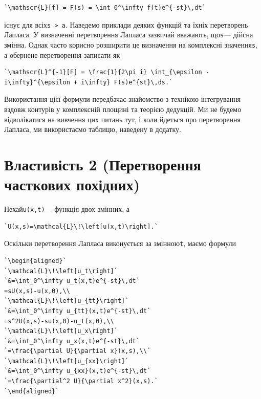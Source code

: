 \documentclass[
  ukrainian,
]{article}
\begin{document}
\begin{verbatim}
`\mathscr{L}[f] = F(s) = \int_0^\infty f(t)e^{-st}\,dt`
\end{verbatim}

існує для всіх\texttt{s\ \textgreater{}\ a}. Наведемо приклади деяких
функцій та їхніх перетворень Лапласа. У визначенні перетворення Лапласа
зазвичай вважають, що\texttt{s}--- дійсна змінна. Однак часто корисно
розширити це визначення на комплексні значення\texttt{s}, а обернене
перетворення записати як

\begin{verbatim}
`\mathscr{L}^{-1}[F] = \frac{1}{2\pi i} \int_{\epsilon - i\infty}^{\epsilon + i\infty} F(s)e^{st}\,ds.`
\end{verbatim}

Використання цієї формули передбачає знайомство з технікою інтегрування
вздовж контурів у комплексній площині та теорією дедукцій. Ми не будемо
відволікатися на вивчення цих питань тут, і коли йдеться про
перетворення Лапласа, ми використаємо таблицю, наведену в додатку.

\section{Властивість 2 (Перетворення часткових
похідних)}\label{ux432ux43bux430ux441ux442ux438ux432ux456ux441ux442ux44c-2-ux43fux435ux440ux435ux442ux432ux43eux440ux435ux43dux43dux44f-ux447ux430ux441ux442ux43aux43eux432ux438ux445-ux43fux43eux445ux456ux434ux43dux438ux445}

Нехай\texttt{u(x,t)}--- функція двох змінних, а

\begin{verbatim}
`U(x,s)=\mathcal{L}\!\left[u(x,t)\right].`
\end{verbatim}

Оскільки перетворення Лапласа виконується за змінною\texttt{t}, маємо
формули

\begin{verbatim}
`\begin{aligned}`
`\mathcal{L}\!\left[u_t\right]`
`&=\int_0^\infty u_t(x,t)e^{-st}\,dt`
=sU(x,s)-u(x,0),\\
`\mathcal{L}\!\left[u_{tt}\right]`
`&=\int_0^\infty u_{tt}(x,t)e^{-st}\,dt`
=s^2U(x,s)-su(x,0)-u_t(x,0),\\
`\mathcal{L}\!\left[u_x\right]`
`&=\int_0^\infty u_x(x,t)e^{-st}\,dt`
`=\frac{\partial U}{\partial x}(x,s),\\`
`\mathcal{L}\!\left[u_{xx}\right]`
`&=\int_0^\infty u_{xx}(x,t)e^{-st}\,dt`
`=\frac{\partial^2 U}{\partial x^2}(x,s).`
`\end{aligned}`
\end{verbatim}
\end{document}
